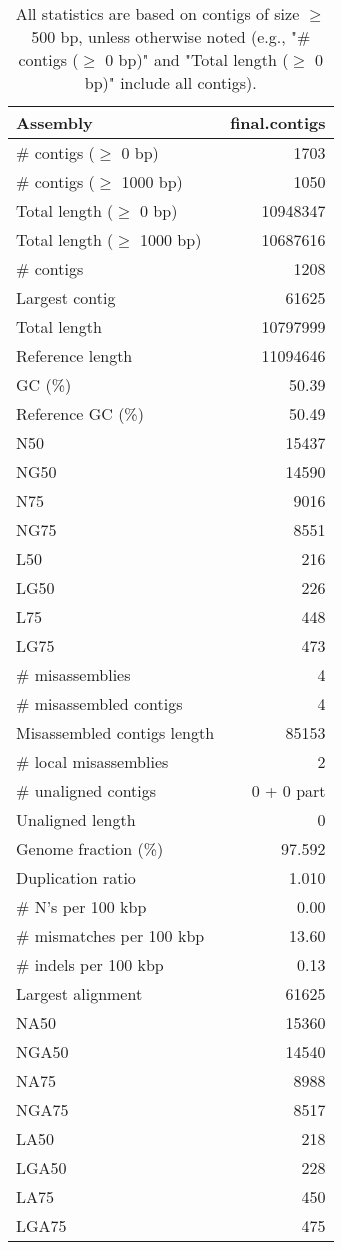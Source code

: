 \documentclass[12pt,a4paper]{article}
\begin{document}
\begin{table}[ht]
\begin{center}
\caption{All statistics are based on contigs of size $\geq$ 500 bp, unless otherwise noted (e.g., "\# contigs ($\geq$ 0 bp)" and "Total length ($\geq$ 0 bp)" include all contigs).}
\begin{tabular}{|l*{1}{|r}|}
\hline
Assembly & final.contigs \\ \hline
\# contigs ($\geq$ 0 bp) & 1703 \\ \hline
\# contigs ($\geq$ 1000 bp) & 1050 \\ \hline
Total length ($\geq$ 0 bp) & 10948347 \\ \hline
Total length ($\geq$ 1000 bp) & 10687616 \\ \hline
\# contigs & 1208 \\ \hline
Largest contig & 61625 \\ \hline
Total length & 10797999 \\ \hline
Reference length & 11094646 \\ \hline
GC (\%) & 50.39 \\ \hline
Reference GC (\%) & 50.49 \\ \hline
N50 & 15437 \\ \hline
NG50 & 14590 \\ \hline
N75 & 9016 \\ \hline
NG75 & 8551 \\ \hline
L50 & 216 \\ \hline
LG50 & 226 \\ \hline
L75 & 448 \\ \hline
LG75 & 473 \\ \hline
\# misassemblies & 4 \\ \hline
\# misassembled contigs & 4 \\ \hline
Misassembled contigs length & 85153 \\ \hline
\# local misassemblies & 2 \\ \hline
\# unaligned contigs & 0 + 0 part \\ \hline
Unaligned length & 0 \\ \hline
Genome fraction (\%) & 97.592 \\ \hline
Duplication ratio & 1.010 \\ \hline
\# N's per 100 kbp & 0.00 \\ \hline
\# mismatches per 100 kbp & 13.60 \\ \hline
\# indels per 100 kbp & 0.13 \\ \hline
Largest alignment & 61625 \\ \hline
NA50 & 15360 \\ \hline
NGA50 & 14540 \\ \hline
NA75 & 8988 \\ \hline
NGA75 & 8517 \\ \hline
LA50 & 218 \\ \hline
LGA50 & 228 \\ \hline
LA75 & 450 \\ \hline
LGA75 & 475 \\ \hline
\end{tabular}
\end{center}
\end{table}
\end{document}
